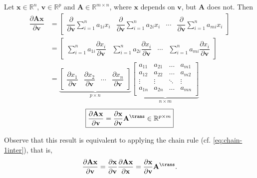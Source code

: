 Let \(\mathbf{x} \in \mathbb{R}^{n}\), \(\mathbf{v} \in \mathbb{R}^{p}\) and \(\mathbf{A} \in \mathbb{R}^{m\times n}\), where \(\mathbf{x}\) depends on \(\mathbf{v}\), but \(\mathbf{A}\) does not. Then
\begin{align}
    \dfrac{\partial \mathbf{A}  \mathbf{x}}{\partial \mathbf{v}} & =
    \begin{bmatrix}
        \dfrac{\partial}{\partial \mathbf{v}}\sum_{i=1}^{n} a_{1i}x_i & \dfrac{\partial}{\partial \mathbf{v}}\sum_{i=1}^{n} a_{2i}x_i & \cdots & \dfrac{\partial}{\partial \mathbf{v}}\sum_{i=1}^{n} a_{mi}x_i
    \end{bmatrix} \\
    & = \begin{bmatrix}
        \sum_{i=1}^{n} a_{1i}\dfrac{\partial x_i}{\partial \mathbf{v}} & \sum_{i=1}^{n} a_{2i}\dfrac{\partial x_i}{\partial \mathbf{v}} & \cdots & \sum_{i=1}^{n} a_{mi}\dfrac{\partial x_i}{\partial \mathbf{v}}
    \end{bmatrix} \\
    & = \underbrace{\begin{bmatrix}
        \dfrac{\partial x_1}{\partial \mathbf{v}} & \dfrac{\partial x_2}{\partial \mathbf{v}} & \cdots & \dfrac{\partial x_n}{\partial \mathbf{v}}
    \end{bmatrix}}_{p \times n}
    \underbrace{\begin{bmatrix}
        a_{11} & a_{21} & \dots & a_{m1} \\
        a_{12} & a_{22} & \dots & a_{m2} \\
        \vdots & \vdots & \ddots & \vdots \\
        a_{1n} & a_{2n} & \dots & a_{mn} \\
    \end{bmatrix}}_{n \times m}
\end{align}
\begin{align}
    \boxed{\dfrac{\partial \mathbf{A}  \mathbf{x}}{\partial \mathbf{v}} = \dfrac{\partial \mathbf{x}}{\partial \mathbf{v}} \mathbf{A}^\trans \in \mathbb{R}^{p \times m}}
\end{align}

Observe that this result is equivalent to applying the chain rule (cf. \eqref{eq:chain-1inter}), that is,
\begin{align}
    \dfrac{\partial \mathbf{A}  \mathbf{x}}{\partial \mathbf{v}} = \dfrac{\partial \mathbf{x}}{\partial \mathbf{v}} \dfrac{\partial \mathbf{A}  \mathbf{x}}{\partial \mathbf{x}} = \dfrac{\partial \mathbf{x}}{\partial \mathbf{v}} \mathbf{A}^\trans.
\end{align}

